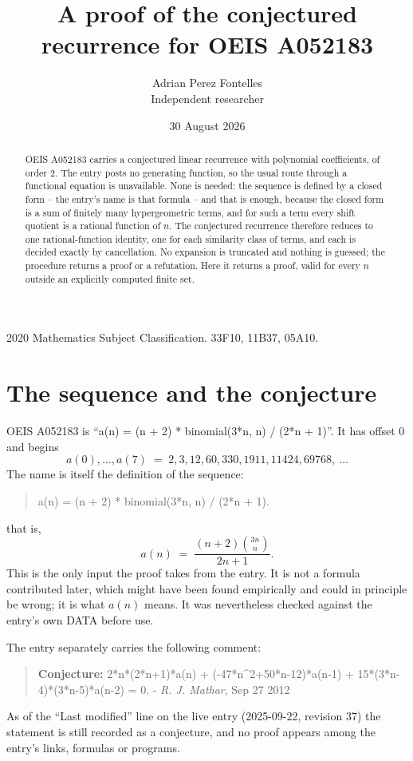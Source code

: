 \documentclass[11pt,a4paper]{article}
\title{A proof of the conjectured recurrence for OEIS A052183}
\author{Adrian Perez Fontelles\\ \small Independent researcher}
\date{30 August 2026}
\theoremstyle{plain}
\theoremstyle{definition}
\begin{document}
\maketitle

\begin{abstract}
OEIS A052183 carries a conjectured linear recurrence with polynomial coefficients, of
order 2. The entry posts no generating function, so the usual route through a
functional equation is unavailable. None is needed: the sequence is defined by a closed
form -- the entry's name is that formula -- and that is enough, because the closed form is a sum of finitely many hypergeometric terms, and for such a
term every shift quotient is a rational function of $n$. The conjectured recurrence
therefore reduces to one rational-function identity, one for each similarity
class of terms, and each is decided exactly by cancellation. No expansion is truncated and
nothing is guessed; the procedure returns a proof or a refutation. Here it returns a proof,
valid for every $n$ outside an explicitly computed finite set.
\end{abstract}

\noindent\small 2020 Mathematics Subject Classification. 33F10, 11B37, 05A10.\normalsize

\section{The sequence and the conjecture}

OEIS A052183 is ``a(n) = (n + 2) * binomial(3*n, n) / (2*n + 1)''. It has offset $0$ and begins
\[
a(0),\dots,a(7)\;=\;2, 3, 12, 60, 330, 1911, 11424, 69768,\ \dots
\]
The name is itself the definition of the sequence:
\begin{quote}\small
a(n) = (n + 2) * binomial(3*n, n) / (2*n + 1).
\end{quote}
that is,
\begin{equation}\label{eq:cf}
a(n)\;=\;\frac{\left(n + 2\right) {\binom{3 n}{n}}}{2 n + 1} .
\end{equation}
This is the only input the proof takes from the entry. It is not a formula contributed
later, which might have been found empirically and could in principle be wrong; it is what
$a(n)$ means. It was nevertheless checked against the entry's own DATA before use.

The entry separately carries the following comment:
\begin{quote}\small
\textbf{Conjecture:} 2*n*(2*n+1)*a(n) + (-47*n\textasciicircum{}2+50*n-12)*a(n-1) + 15*(3*n-4)*(3*n-5)*a(n-2) = 0. - \emph{R. J. Mathar}, Sep 27 2012
\end{quote}
As of the ``Last modified'' line on the live entry (2025-09-22, revision 37) the
statement is still recorded as a conjecture, and no proof appears among the entry's links,
formulas or programs.
\end{document}
